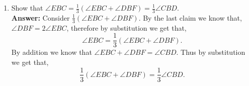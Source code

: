 \documentclass[12pt]{article}
\theoremstyle{homework}
\begin{document}
\begin{enumerate}
  
  
  \item Show that $\angle EBC = \frac{1}{3}(\angle EBC + \angle DBF) = \frac{1}{3}\angle CBD$.\\
  
  \textbf{Answer:} Consider $\frac{1}{3}(\angle EBC + \angle DBF)$. By the last claim we know that, $\angle DBF = 2\angle EBC$, 
  therefore by substitution we get that, 
  \begin{equation*}
    \angle EBC = \frac{1}{3}(\angle EBC + \angle DBF).
  \end{equation*}
  By addition we know that $\angle EBC + \angle DBF = \angle CBD$. Thus by substitution we get that,
  \begin{equation*}
    \frac{1}{3}(\angle EBC + \angle DBF) = \frac{1}{3}\angle CBD.
  \end{equation*}
  \vspace{.5in}

\end{enumerate}
\vspace{.5in}
\end{document}
